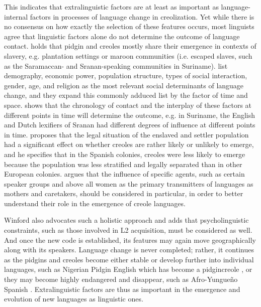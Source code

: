 \documentclass[output=paper,
modfonts
]{langscibook}
\begin{document}
This indicates that extralinguistic factors are at least as important as language-internal factors in processes of language change in creolization. Yet while there is no consensus on how exactly the selection of these features occurs, most linguists agree that linguistic factors alone do not determine the outcome of language contact. \cite{meshtrie2017slavery} holds that pidgin and creoles mostly share their emergence in contexts of slavery, e.g. plantation settings or maroon communities (i.e. escaped slaves, such as the Saramaccan- and Sranan-speaking communities in Suriname). \cite{mufweneetal2017} list demography, economic power, population structure, types of social interaction, gender, age, and religion as the most relevant social determinants of language change, and they expand this commonly adduced list by the factor of time and space. \cite{arends2017language} shows that the chronology of contact and the interplay of these factors at different points in time will determine the outcome, e.g. in Suriname, the English and Dutch lexifiers of Sranan had different degrees of influence at different points in time. \cite{sessarego2017legal} proposes that the legal situation of the enslaved and settler population had a significant effect on whether creoles are rather likely or unlikely to emerge, and he specifies that in the Spanish colonies, creoles were less likely to emerge because the population was less stratified and legally separated than in other European colonies. \cite{faraclas2012women} argues that the influence of specific agents, such as certain speaker groups and above all women as the primary transmitters of languages as mothers and caretakers, should be considered in particular, in order to better understand their role in the emergence of creole languages.

Winford \citep[cited in][]{baptista2017competition} also advocates such a holistic approach and adds that psycholinguistic constraints, such as those involved in L2 acquisition, must be considered as well. And once the new code is established, its features may again move geographically along with its speakers. Language change is never completed; rather, it continues as the pidgins and creoles become either stable or develop further into individual languages, such as Nigerian Pidgin English which has become a pidgincreole \citep[cf.][]{bakker2008pidgins}, or they may become highly endangered and disappear, such as Afro-Yungueño Spanish \citep{perez2015traces}. Extralinguistic factors are thus as important in the emergence and evolution of new languages as linguistic ones.
\end{document}
